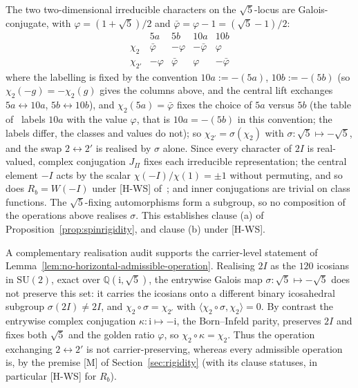 \documentclass[11pt]{article}
\theoremstyle{definition}
\theoremstyle{remark}
\begin{document}
    The two two-dimensional irreducible characters on the $\sqrt{5}$-locus are Galois-conjugate, with
    $\varphi=(1+\sqrt{5})/2$ and $\bar\varphi=\varphi-1=(\sqrt{5}-1)/2$:
    \[
      \begin{array}{c|cccc}
        & 5a & 5b & 10a & 10b\\
\hline
\chi_{2} & \bar\varphi & -\varphi & -\bar\varphi & \varphi\\
\chi_{2'} & -\varphi & \bar\varphi & \varphi & -\bar\varphi
      \end{array}
    \]
    where the labelling is fixed by the convention $10a:=-(5a)$, $10b:=-(5b)$ (so $\chi_2(-g)=-\chi_2(g)$ gives the
columns above, and the central lift exchanges $5a\leftrightarrow10a$, $5b\leftrightarrow10b$), and $\chi_2(5a)=\bar\varphi$
fixes the choice of $5a$ versus $5b$ (the table of~\cite{Beau2026a1} labels $10a$ with the value $\varphi$, that is $10a=-(5b)$ in this convention; the labels differ, the classes and values do not); so $\chi_{2'}=\sigma(\chi_2)$ with $\sigma:\sqrt{5}\mapsto-\sqrt{5}$, and the swap $2\leftrightarrow2'$ is realised
    by $\sigma$ alone.
    Since every character of $2I$ is real-valued, complex conjugation $J_\Pi$ fixes each irreducible representation; the
    central element $-I$ acts by the scalar $\chi(-I)/\chi(1)=\pm1$ without permuting, and so does $R_b=W(-I)$ under
    [H-WS] of~\cite{Beau2026q11of}; and inner
    conjugations are trivial on class functions.
    The $\sqrt{5}$-fixing automorphisms form a subgroup, so no composition of the operations above realises $\sigma$.
    This establishes clause (a) of Proposition~\ref{prop:spinrigidity}, and clause (b) under [H-WS].

    A complementary realisation audit supports the carrier-level statement of
    Lemma~\ref{lem:no-horizontal-admissible-operation}.
    Realising $2I$ as the $120$ icosians in $\mathrm{SU}(2)$, exact over $\mathbb{Q}(\mathrm{i},\sqrt{5})$, the
    entrywise Galois map $\sigma:\sqrt{5}\mapsto-\sqrt{5}$ does not preserve this set: it carries the icosians onto
    a different binary icosahedral subgroup $\sigma(2I)\neq 2I$, and $\chi_2\circ\sigma=\chi_{2'}$ with
    $\langle\chi_2\circ\sigma,\chi_2\rangle=0$.
    By contrast the entrywise complex conjugation $\kappa:\mathrm{i}\mapsto-\mathrm{i}$, the Born--Infeld parity,
    preserves $2I$ and fixes both $\sqrt{5}$ and the golden ratio $\varphi$, so $\chi_2\circ\kappa=\chi_2$.
    Thus the operation exchanging $2\leftrightarrow2'$ is not carrier-preserving, whereas every admissible operation is,
    by the premise [M] of Section~\ref{sec:rigidity} (with its clause statuses, in particular [H-WS] for $R_b$).
\end{document}
